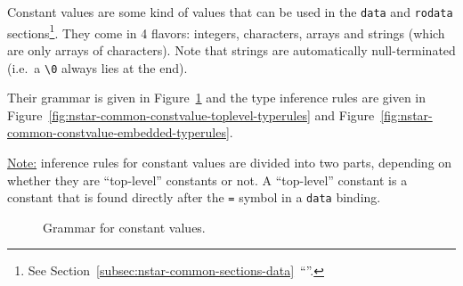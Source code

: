 Constant values are some kind of values that can be used in the \texttt{data} and \texttt{rodata} sections\footnote{See Section~\ref{subsec:nstar-common-sections-data}~``''.}.
They come in 4 flavors: integers, characters, arrays and strings (which are only arrays of characters).
Note that strings are automatically null-terminated (i.e.\ a \texttt{\textbackslash 0} always lies at the end).

Their grammar is given in Figure~\ref{fig:nstar-common-constvalue-grammar} and the type inference rules are given in Figure~\ref{fig:nstar-common-constvalue-toplevel-typerules} and Figure~\ref{fig:nstar-common-constvalue-embedded-typerules}.

\underline{Note:} inference rules for constant values are divided into two parts, depending on whether they are ``top-level'' constants or not.
A ``top-level'' constant is a constant that is found directly after the \texttt{=} symbol in a \texttt{data} binding.

\begin{figure}[htb]
  \centering


  \caption{Grammar for constant values.}
  \label{fig:nstar-common-constvalue-grammar}
\end{figure}

